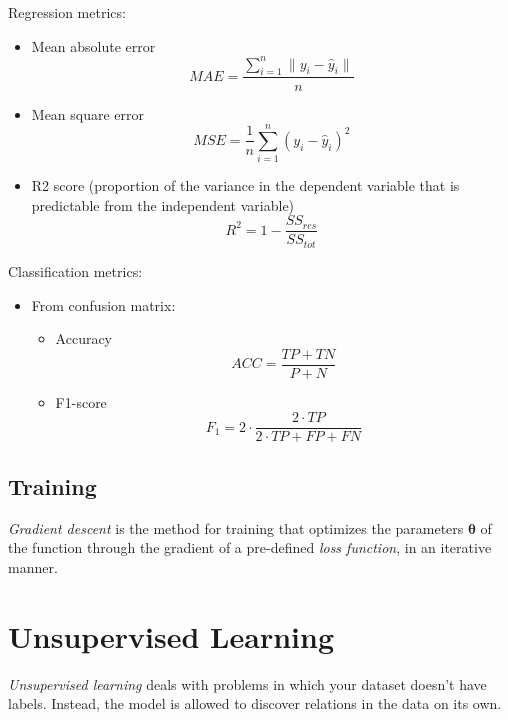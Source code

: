 \documentclass[a4paper]{report}
\begin{document}
Regression metrics:

\begin{itemize}
    \item Mean absolute error \[
    MAE = \frac{\sum_{i=1}^{n}\|y_i - \hat{y}_i\|}{n}
    \] 
\item Mean square error \[
	MSE = \frac{1}{n}\sum_{i=1}^{n}\left( y_i - \hat{y}_i \right) ^{2}
\] 
\item R2 score (proportion of the variance in the dependent variable that is predictable from the independent variable) \[
R^2 = 1 - \frac{SS_{res}}{SS_{tot}}
\] 
\end{itemize}

Classification metrics:
\begin{itemize}
    \item From confusion matrix:
	\begin{itemize}
	    \item Accuracy \[
	    ACC = \frac{TP + TN}{P + N}
	    \] 
	\item F1-score \[
	F_1 = 2\cdot \frac{2\cdot TP}{2\cdot  TP + FP + FN}
	\] 
	\end{itemize}
\end{itemize}

\subsection*{Training}

\begin{definition}
    \emph{Gradient descent} is the method for training that optimizes the parameters $\bm{\theta}$ of the function through the gradient of a pre-defined \emph{loss function}, in an iterative manner.
\end{definition}

\section*{Unsupervised Learning}

\begin{definition}
    \emph{Unsupervised learning} deals with problems in which your dataset doesn't have labels. Instead, the model is allowed to discover relations in the data on its own.
\end{definition}
\end{document}
